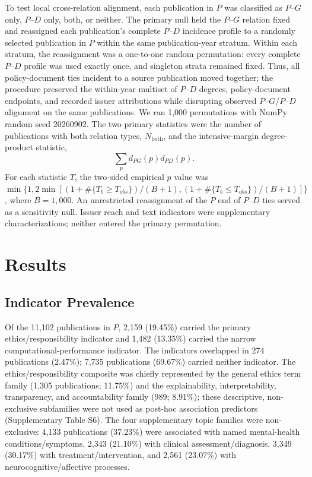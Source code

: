 \documentclass[12pt]{article}
\begin{document}
To test local cross-relation alignment, each publication in $P$ was classified as $P$--$G$ only, $P$--$D$ only, both, or neither. The primary null held the $P$--$G$ relation fixed and reassigned each publication's complete $P$--$D$ incidence profile to a randomly selected publication in $P$ within the same publication-year stratum. Within each stratum, the reassignment was a one-to-one random permutation: every complete $P$--$D$ profile was used exactly once, and singleton strata remained fixed. Thus, all policy-document ties incident to a source publication moved together; the procedure preserved the within-year multiset of $P$--$D$ degrees, policy-document endpoints, and recorded issuer attributions while disrupting observed $P$--$G$/$P$--$D$ alignment on the same publications. We ran 1,000 permutations with NumPy random seed 20260902. The two primary statistics were the number of publications with both relation types, $N_{\mathrm{both}}$, and the intensive-margin degree-product statistic,
\[
\sum_p d_{PG}(p)d_{PD}(p).
\]
For each statistic $T$, the two-sided empirical $p$ value was $\min\{1,2\min[(1+\#\{T_b\geq T_{obs}\})/(B+1),(1+\#\{T_b\leq T_{obs}\})/(B+1)]\}$, where $B=1{,}000$. An unrestricted reassignment of the $P$ end of $P$--$D$ ties served as a sensitivity null. Issuer reach and text indicators were supplementary characterizations; neither entered the primary permutation.

\section{Results}

\subsection{Indicator Prevalence}

Of the 11,102 publications in $P$, 2,159 (19.45\%) carried the primary ethics/responsibility indicator and 1,482 (13.35\%) carried the narrow computational-performance indicator. The indicators overlapped in 274 publications (2.47\%); 7,735 publications (69.67\%) carried neither indicator. The ethics/responsibility composite was chiefly represented by the general ethics term family (1,305 publications; 11.75\%) and the explainability, interpretability, transparency, and accountability family (989; 8.91\%); these descriptive, non-exclusive subfamilies were not used as post-hoc association predictors (Supplementary Table S6). The four supplementary topic families were non-exclusive: 4,133 publications (37.23\%) were associated with named mental-health conditions/symptoms, 2,343 (21.10\%) with clinical assessment/diagnosis, 3,349 (30.17\%) with treatment/intervention, and 2,561 (23.07\%) with neurocognitive/affective processes.
\end{document}
